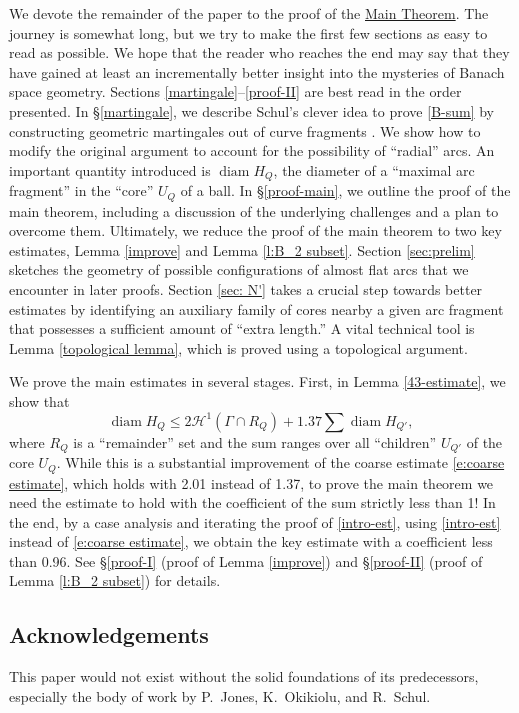 \documentclass[12pt]{amsart}
\numberwithin{equation}{section}
\theoremstyle{plain}
\theoremstyle{definition}
\newcommand{\diam}{\mathop\mathrm{diam}\nolimits}
\newcommand{\Haus}{\mathcal{H}}
\numberwithin{figure}{section}
\begin{document}
We devote the remainder of the paper to the proof of the \hyperref[t:main]{Main Theorem}. The journey is somewhat long, but we try to make the first few sections as easy to read as possible. We hope that the reader who reaches the end may say that they have gained at least an incrementally better insight into the mysteries of Banach space geometry. Sections \ref{martingale}--\ref{proof-II} are best read in the order presented. In \S\ref{martingale}, we describe Schul's clever idea to prove \eqref{B-sum} by constructing geometric martingales out of curve fragments \cite{Schul-Hilbert}. We show how to modify the original argument to account for the possibility of ``radial'' arcs. An important quantity introduced is $\diam H_Q$, the diameter of a ``maximal arc fragment'' in the ``core'' $U_Q$ of a ball. In \S\ref{proof-main}, we outline the proof of the main theorem, including a discussion of the underlying challenges and a plan to overcome them. Ultimately, we reduce the proof of the main theorem to two key estimates, Lemma \ref{improve} and Lemma \ref{l:B_2 subset}. Section \ref{sec:prelim} sketches the geometry of possible configurations of almost flat arcs that we encounter in later proofs. Section \ref{sec: N'} takes a crucial step towards better estimates by identifying an auxiliary family of cores nearby a given arc fragment that possesses a sufficient amount of ``extra length.'' A vital technical tool is Lemma \ref{topological lemma}, which is proved using a topological argument.

We prove the main estimates in several stages. First, in Lemma \ref{43-estimate}, we show that \begin{equation}\label{intro-est} \diam H_Q\leq 2\Haus^1(\Gamma\cap R_Q)+1.37\sum \diam H_{Q'},\end{equation} where $R_Q$ is a ``remainder'' set and the sum ranges over all ``children'' $U_{Q'}$ of the core $U_Q$. While this is a substantial improvement of the coarse estimate \eqref{e:coarse estimate}, which holds with 2.01 instead of 1.37, to prove the main theorem we need the estimate to hold with the coefficient of the sum strictly less than 1! In the end, by a case analysis and iterating the proof of \eqref{intro-est}, using \eqref{intro-est} instead of \eqref{e:coarse estimate}, we obtain the key estimate with a coefficient less than 0.96. See \S\ref{proof-I} (proof of Lemma \ref{improve}) and \S\ref{proof-II} (proof of Lemma \ref{l:B_2 subset}) for details.


\subsection{Acknowledgements} %
This paper would not exist without the solid foundations of its predecessors, especially the body of work by P.~Jones, K.~Okikiolu, and R.~Schul.
\end{document}
